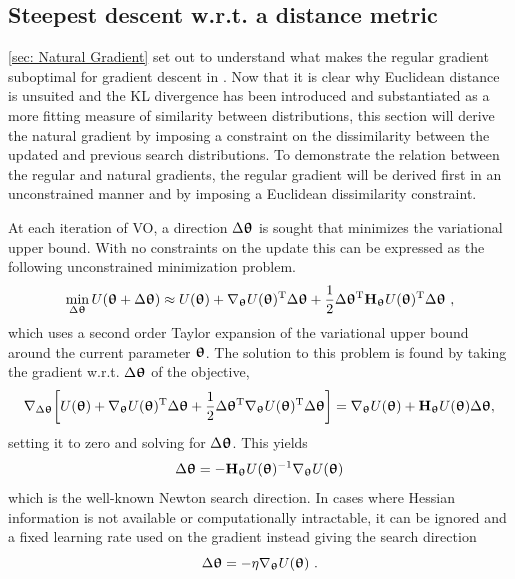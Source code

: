 \subsection{Steepest descent w.r.t. a distance metric}\label{sec: Natural Gradient: Steepest descent w.r.t. a distance metric}
\autoref{sec: Natural Gradient} set out to understand what makes the regular gradient suboptimal for gradient descent in . Now that it is clear why Euclidean distance is unsuited and the \gls{KL} divergence has been introduced and substantiated as a more fitting measure of similarity between distributions, this section will derive the natural gradient by imposing a constraint on the dissimilarity between the updated and previous search distributions. To demonstrate the relation between the regular and natural gradients, the regular gradient will be derived first in an unconstrained manner and by imposing a Euclidean dissimilarity constraint.

At each iteration of \gls{VO}, a direction $\Delta{\boldsymbol{\uptheta}}$ is sought that minimizes the variational upper bound. With no constraints on the update this can be expressed as the following unconstrained minimization problem.
\begin{equation}\label{eq: Theory: Unconstrained VO optimization problem at each iteration}
    \min_{\Delta{\boldsymbol{\uptheta}}} U({\boldsymbol{\uptheta}}+\Delta{\boldsymbol{\uptheta}}) \approx U({\boldsymbol{\uptheta}}) + \nabla_{\boldsymbol{\uptheta}} U({\boldsymbol{\uptheta}}){^\mathrm{T}}\Delta{\boldsymbol{\uptheta}} + \frac{1}{2}\Delta{\boldsymbol{\uptheta}}{^\mathrm{T}}{\mathbf{H}}_{\boldsymbol{\uptheta}} U({\boldsymbol{\uptheta}}){^\mathrm{T}}\Delta{\boldsymbol{\uptheta}} \ ,
\end{equation}
which uses a second order Taylor expansion of the variational upper bound around the current parameter ${\boldsymbol{\uptheta}}$. The solution to this problem is found by taking the gradient w.r.t. $\Delta{\boldsymbol{\uptheta}}$ of the objective,
\begin{equation}
    \nabla_{\Delta{\boldsymbol{\uptheta}}}{\left[U({\boldsymbol{\uptheta}}) + \nabla_{\boldsymbol{\uptheta}} U({\boldsymbol{\uptheta}}){^\mathrm{T}}\Delta{\boldsymbol{\uptheta}} + \frac{1}{2}\Delta{\boldsymbol{\uptheta}}{^\mathrm{T}}\nabla_{\boldsymbol{\uptheta}} U({\boldsymbol{\uptheta}}){^\mathrm{T}}\Delta{\boldsymbol{\uptheta}}\right]} = \nabla_{\boldsymbol{\uptheta}} U({\boldsymbol{\uptheta}}) + {\mathbf{H}}_{\boldsymbol{\uptheta}} U({\boldsymbol{\uptheta}})\Delta{\boldsymbol{\uptheta}},
\end{equation}
setting it to zero and solving for $\Delta{\boldsymbol{\uptheta}}$. This yields
\begin{equation*}
    \Delta{\boldsymbol{\uptheta}} = -{\mathbf{H}}_{\boldsymbol{\uptheta}} U({\boldsymbol{\uptheta}})^{-1}\nabla_{\boldsymbol{\uptheta}} U({\boldsymbol{\uptheta}})
\end{equation*}
which is the well-known Newton search direction. In cases where Hessian information is not available or computationally intractable, it can be ignored and a fixed learning rate used on the gradient instead giving the search direction
\begin{equation}
    \Delta{\boldsymbol{\uptheta}} = -\eta\nabla_{\boldsymbol{\uptheta}} U({\boldsymbol{\uptheta}}) \ .
\end{equation}

